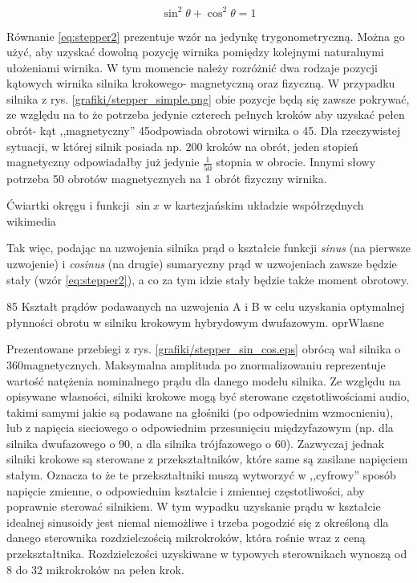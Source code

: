 \begin{equation} \label{eq:stepper2}
	\sin^2\theta + \cos^2\theta = 1
\end{equation}

Równanie \ref{eq:stepper2} prezentuje wzór na jedynkę trygonometryczną. Można go użyć, aby uzyskać dowolną pozycję wirnika pomiędzy kolejnymi naturalnymi ułożeniami wirnika. W tym momencie należy rozróżnić dwa rodzaje pozycji kątowych wirnika silnika krokowego- magnetyczną oraz fizyczną. W przypadku silnika z rys. \ref{grafiki/stepper_simple.png} obie pozycje będą się zawsze pokrywać, ze względu na to że potrzeba jedynie czterech pełnych kroków aby uzyskać pełen obrót- kąt ,,magnetyczny'' 45\degree odpowiada obrotowi wirnika o 45\degree. Dla rzeczywistej sytuacji, w której silnik posiada np. 200 kroków na obrót, jeden stopień magnetyczny odpowiadałby już jedynie $ \frac{1}{50} $ stopnia w obrocie. Innymi słowy potrzeba 50 obrotów magnetycznych na 1 obrót fizyczny wirnika.

		{Ćwiartki okręgu i funkcji $ \sin x $ w kartezjańskim układzie współrzędnych}
		{wikimedia}
		
Tak więc, podając na uzwojenia silnika prąd o kształcie funkcji {\it sinus} (na pierwsze uzwojenie) i {\it cosinus} (na drugie) sumaryczny prąd w uzwojeniach zawsze będzie stały (wzór \ref{eq:stepper2}), a co za tym idzie stały będzie także moment obrotowy.

		{85}
		{Kształt prądów podawanych na uzwojenia A i B w celu uzyskania optymalnej płynności obrotu w silniku krokowym hybrydowym dwufazowym.}
		{oprWlasne}
		
Prezentowane przebiegi z rys. \ref{grafiki/stepper_sin_cos.eps} obrócą wał silnika o 360\degree magnetycznych. Maksymalna amplituda po znormalizowaniu reprezentuje wartość natężenia nominalnego prądu dla danego modelu silnika.
Ze względu na opisywane własności, silniki krokowe mogą być sterowane częstotliwościami audio, takimi samymi jakie są podawane na głośniki (po odpowiednim wzmocnieniu), lub z napięcia sieciowego o odpowiednim przesunięciu międzyfazowym (np. dla silnika dwufazowego o 90\degree, a dla silnika trójfazowego o 60\degree).
Zazwyczaj jednak silniki krokowe są sterowane z przekształtników, które same są zasilane napięciem stałym. Oznacza to że te przekształtniki muszą wytworzyć w ,,cyfrowy'' sposób napięcie zmienne, o odpowiednim kształcie i zmiennej częstotliwości, aby poprawnie sterować silnikiem. W tym wypadku uzyskanie prądu w kształcie idealnej sinusoidy jest niemal niemożliwe i trzeba pogodzić się z określoną dla danego sterownika rozdzielczością mikrokroków, która rośnie wraz z ceną przekształtnika. Rozdzielczości uzyskiwane w typowych sterownikach wynoszą od 8 do 32 mikrokroków na pełen krok. 

